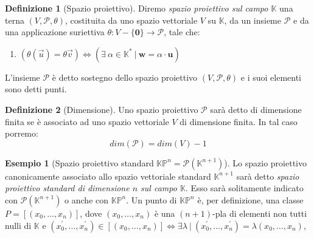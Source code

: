\documentclass{book}
\theoremstyle{definition}
\newtheorem{definizione}{Definizione}
\newtheorem{esempio}{Esempio}
\newcommand{\CMP}{\mathbb{K}}
\newcommand{\Spr}{\mathscr{P}}
\begin{document}
\medskip

\begin{definizione}[Spazio proiettivo]
    Diremo \emph{spazio proiettivo sul campo $\mathbb{K}$} una terna $(V, \Spr, \theta)$, costituita da uno spazio vettoriale
    $V$ su $\mathbb{K}$, da un insieme $\Spr$ e da una applicazione suriettiva $\theta: V - \{\mathbf{0}\} \rightarrow \Spr$, tale che:
    
    \begin{enumerate}[label=(SP\arabic*.),itemindent=*]
        \item $(\theta(\vec{u}) = \theta{\vec{v}}) \iff (\exists \ \alpha \in \mathbb{K}^{*} \ | \ \mathbf{w} = \alpha \cdot \mathbf{u})$
    \end{enumerate}

    L'insieme $\Spr$ è detto sostegno dello spazio proiettivo $(V, \Spr, \theta)$ e i suoi elementi sono detti punti.

\end{definizione}

\begin{definizione}[Dimensione]
    Uno spazio proiettivo $\Spr$ sarà detto di dimensione finita se è associato ad uno spazio vettoriale $V$ di dimensione finita.
    In tal caso porremo:
    \[
        dim(\Spr) = dim(V) -1
    \]
\end{definizione}

\begin{esempio}[Spazio proiettivo standard $\mathbb{KP}^n = \mathscr{P}(\mathbb{K}^{n+1})$]
    Lo spazio proiettivo canonicamente associato allo spazio vettoriale standard $\CMP^{n+1}$ sarà detto \emph{spazio proiettivo standard di dimensione $n$ sul campo $\CMP$}.
    Esso sarà solitamente indicato con $\Spr(\CMP^{n+1})$ o anche con $\mathbb{KP}^n$.
    Un punto di $\mathbb{KP}^n$ è, per definizione, una classe $P=[(x_0, \dots, x_n)]$, dove $(x_0, \dots, x_n)$ è una $(n+1)$-pla di elementi non tutti nulli di $\CMP$ e 
    $(x_0^\prime, \dots, x_n^\prime) \in [(x_0, \dots, x_n)] \iff \exists \lambda \ | \ (x_0^\prime, \dots, x_n^\prime) = \lambda (x_0, \dots, x_n)$,
\end{esempio}
\end{document}

